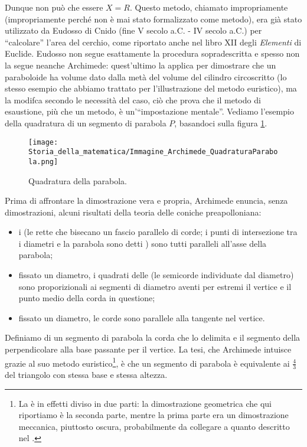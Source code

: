 \par Dunque non pu\`o che essere $X = R$. Questo metodo, chiamato impropriamente  (impropriamente perch\'e non \`e mai stato formalizzato come metodo), era gi\`a stato utilizzato da Eudosso di Cnido (fine V secolo a.C. - IV secolo a.C.) per ``calcolare'' l'area del cerchio, come riportato anche nel libro XII degli \textit{Elementi} di Euclide. Eudosso non segue esattamente la procedura sopradescritta e spesso non la segue neanche Archimede: quest'ultimo la applica per dimostrare che un paraboloide ha volume dato dalla met\`a del volume del cilindro circoscritto (lo stesso esempio che abbiamo trattato per l'illustrazione del metodo euristico), ma la modifca secondo le necessit\`a del caso, ci\`o che prova che il metodo di esaustione, pi\`u che un metodo, \`e un'``impostazione mentale''. Vediamo l'esempio della quadratura di un segmento di parabola $P$, basandoci sulla figura \ref{Archimede_QuadraturaParabola}.
\begin{figure}
	\texttt{[image: Storia\_della\_matematica/Immagine\_Archimede\_QuadraturaParabola.png]}
	\centering
	\caption{Quadratura della parabola.}
	\label{Archimede_QuadraturaParabola}
\end{figure}
\par Prima di affrontare la dimostrazione vera e propria, Archimede enuncia, senza dimostrazioni, alcuni risultati della teoria delle coniche preapolloniana:
\begin{itemize}
	\item i  (le rette che bisecano un fascio parallelo di corde; i punti di intersezione tra i diametri e la parabola sono detti ) sono tutti paralleli all'asse della parabola;
	\item fissato un diametro, i quadrati delle  (le semicorde individuate dal diametro) sono proporizionali ai segmenti di diametro aventi per estremi il vertice e il punto medio della corda in questione;
	\item fissato un diametro, le corde sono parallele alla tangente nel vertice.
\end{itemize}
\par Definiamo  di un segmento di parabola la corda che lo delimita e  il segmento della perpendicolare alla base passante per il vertice. La tesi, che Archimede intuisce grazie al suo metodo euristico\footnote{La  \`e in effetti diviso in due parti: la dimostrazione geometrica che qui riportiamo \`e la seconda parte, mentre la prima parte era un dimostrazione meccanica, piuttosto oscura, probabilmente da collegare a quanto descritto nel .}, \`e che un segmento di parabola \`e equivalente ai $\frac{4}{3}$ del triangolo con stessa base e stessa altezza.

